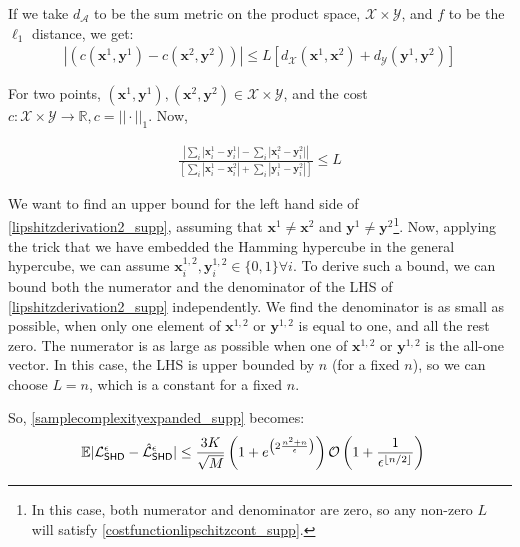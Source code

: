 If we take $d_{\mathcal{A}}$ to be the sum metric on the product space, $\mathcal{X}\times\mathcal{Y}$, and $f$ to be the $\ell_1$ distance, we get:
\begin{align}
    |(c(\mathbf{x}^1, \mathbf{y}^1) - c(\mathbf{x}^2, \mathbf{y}^2))| \leq L \left[d_{\mathcal{X}}(\mathbf{x}^1, \mathbf{x}^2)+ d_{\mathcal{Y}}(\mathbf{y}^1, \mathbf{y}^2)\right] \label{costfunctionlipschitzcont_supp}
\end{align}

For two points, $(\mathbf{x}^1, \mathbf{y}^1), (\mathbf{x}^2, \mathbf{y}^2) \in \mathcal{X}\times \mathcal{Y}$, and the cost $c:\mathcal{X}\times\mathcal{Y}\rightarrow \mathbb{R}, c = ||\cdot||_1$.
Now, 

\begin{align}
    \frac{\left|\sum_i |\mathbf{x}_i^1 - \mathbf{y}_i^1| - \sum_i |\mathbf{x}_i^2 - \mathbf{y}_i^2| \right|}{\left[\sum_i |\mathbf{x}_i^1 - \mathbf{x}_i^2| + \sum_i |\mathbf{y}_i^1 - \mathbf{y}_i^2| \right]} \leq L \label{lipshitzderivation2_supp}
\end{align}


We want to find an upper bound for the left hand side of \eqref{lipshitzderivation2_supp}, assuming that $\mathbf{x}^1 \neq \mathbf{x}^2$ and $\mathbf{y}^1 \neq \mathbf{y}^2$\footnote{In this case, both numerator and denominator are zero, so any non-zero $L$ will satisfy \eqref{costfunctionlipschitzcont_supp}.}. Now, applying the trick that we have embedded the Hamming hypercube in the general hypercube, we can assume $\mathbf{x}^{1,2}_i, \mathbf{y}^{1,2}_i \in \{0, 1\}\forall i$. To derive such a bound, we can bound both the numerator and the denominator of the LHS of \eqref{lipshitzderivation2_supp} independently. We find the denominator is as small as possible, when only one element of $\mathbf{x}^{1,2}$ or $\mathbf{y}^{1,2}$ is equal to one, and all the rest zero.  The numerator is as large as possible when one of $\mathbf{x}^{1,2}$ or $\mathbf{y}^{1,2}$ is the all-one vector. In this case, the LHS is upper bounded by $n$ (for a fixed $n$), so we can choose $L = n$, which is a constant for a fixed $n$.

So, \eqref{samplecomplexityexpanded_supp} becomes:
\begin{align}
     &\mathbb{E}|\mathcal{L}_{\operatorname{\textsf{SHD}}}^\epsilon - \hat{\mathcal{L}}_{\operatorname{\textsf{SHD}}}^\epsilon| \leq \frac{3K}{\sqrt{M}}\left(1+e^{\left(2\frac{n^2+n}{\epsilon}\right)}\right)\mathcal{O}\left(1+\frac{1}{\epsilon^{\lfloor n/2\rfloor}}\right)
\end{align}

